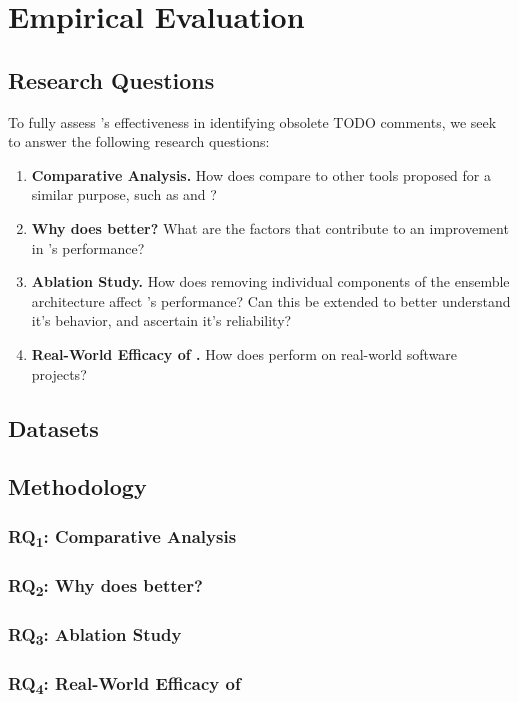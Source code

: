 \section{Empirical Evaluation}

\subsection{Research Questions}
\par To fully assess \tool's effectiveness in identifying obsolete 
TODO comments, we seek to answer the following research questions:

\begin{enumerate}[leftmargin=3.5em, label=\textbf{RQ\textsubscript{\arabic*} :}]
    \item \textbf{Comparative Analysis.} How does \tool compare
    to other tools proposed for a similar purpose, such as 
    \tdcleaner and \irsc?
    \item \textbf{Why \tool does better?} What are the factors
    that contribute to an improvement in \tool's performance?
    \item \textbf{Ablation Study.} How does removing individual 
    components of the ensemble architecture affect \tool's 
    performance? Can this be extended to better understand it's 
    behavior, and ascertain it's reliability? 
    \item \textbf{Real-World Efficacy of \tool.} How does \tool 
    perform on real-world software projects?
\end{enumerate}

\subsection{Datasets}

\subsection{Methodology}

\subsubsection{RQ\textsubscript{1}: Comparative Analysis}

\subsubsection{RQ\textsubscript{2}: Why \tool does better?}

\subsubsection{RQ\textsubscript{3}: Ablation Study}

\subsubsection{RQ\textsubscript{4}: Real-World Efficacy of \tool}